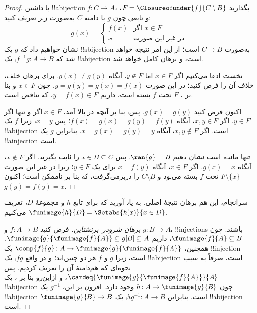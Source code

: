 \documentclass[../../../include/open-logic-section]{subfiles}
\begin{document}
\begin{proof}
با داشتن !!a{bijection} $f \colon C \to A$، بگذارید $F =
\Closureofunder{f}{C \setminus B}$، و تابعی چون $g$ با دامنهٔ $C$ به‌صورت
زیر تعریف کنید:
\[
	g(x) =
	\begin{cases}
			f(x) &\text{اگر $x \in F$}\\
			x & \text{در غیر این صورت}
		\end{cases}
\]
نشان خواهیم داد که $g$ یک !!a{bijection} به‌صورت $C \to B$ است؛ از این امر
نتیجه خواهد شد که $\comp{f^{-1}}{g} \colon A \to B$ یک !!a{bijection}
است، و برهان کامل خواهد شد.

نخست ادعا می‌کنیم اگر $x \in F$ اما $y\notin F$، آنگاه $g(x) \neq
g(y)$. برای برهان خلف، خلاف آن را فرض کنید؛ در این صورت $y = g(y) = g(x) =
f(x)$. چون $x \in F$ و بنا بر ، $F$ تحت $f$ بسته
است، داریم $y = f(x) \in F$، که تناقض است.

اکنون فرض کنید $g(x) = g(y)$. پس، بنا بر آنچه در بالا آمد، $x \in F$ اگر
و تنها اگر $y \in F$. اگر $x, y \in F$، آنگاه $f(x) = g (x) = g(y) = f(y)$؛
پس $x = y$، زیرا $f$ یک !!a{bijection} است. اگر $x, y \notin F$، آنگاه
$x = g(x) = g(y) = y$. بنابراین $g$ یک !!a{injection} است.

تنها مانده است نشان دهیم $\ran{g} = B$. پس $x \in B \subseteq C$ را ثابت
بگیرید. اگر $x \notin F$، آنگاه $g(x) = x$. اگر $x \in F$، آنگاه
$x = f(y)$ برای یک $y \in F$؛ زیرا در غیر این صورت $F \setminus \{x\}$
تحت $f$ بسته می‌بود و $C\setminus B$ را دربرمی‌گرفت، که بنا بر
 ناممکن است؛ اکنون $g(y) = f(y) = x$.
\end{proof}

سرانجام، این هم برهان نتیجهٔ اصلی. به یاد آورید که برای تابع $h$ و مجموعهٔ
$D$، تعریف می‌کنیم $\funimage{h}{D} = \Setabs{h(x)}{x
\in D}$.

\begin{proof}[برهان شرودر–برنشتاین] فرض کنید $f \colon A \to B$
و $g \colon B \to A$، !!{injection}s باشند. چون $\funimage{f}{A}
\subseteq B$، داریم $\funimage{g}{\funimage{f}{A}} \subseteq
g[B] \subseteq A$. همچنین، $\comp{f}{g} \colon A \to
\funimage{g}{\funimage{f}{A}}$ یک !!{injection} است، زیرا $g$ و
$f$ هر دو چنین‌اند؛ و در واقع $\comp{f}{g}$ یک !!a{bijection} است، صرفاً
به سبب نحوه‌ای که هم‌دامنهٔ آن را تعریف کردیم. پس
$\cardeq{\funimage{g}{\funimage{f}{A}}}{A}$، و ازاین‌رو بنا بر
، یک !!a{bijection} چون $h \colon A \to
\funimage{g}{B}$ وجود دارد. افزون بر این، $g^{-1}$ یک !!a{bijection}
$\funimage{g}{B} \to B$ است. بنابراین $\comp{h}{g^{-1}} \colon A \to B$
یک !!a{bijection} است.
\end{proof}
\end{document}
